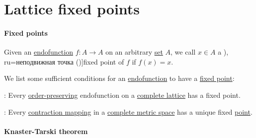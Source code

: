 \section{Lattice fixed points}\label{sec:lattice_fixed_points}

\paragraph{Fixed points}

\begin{definition}\label{def:function_fixed_point}
  Given an \hyperref[def:function/endofunction]{endofunction} \( f: A \to A \) on an arbitrary \hyperref[def:set]{set} \( A \), we call \( x \in A \) a \term[bg=неподвижна точка (\cite[138]{Боянов2008ЧислениМетоди}), ru=неподвижная точка (\cite[\S 1.8.6]{Новиков2013ДискретнаяМатематика})]{fixed point} of \( f \) if \( f(x) = x \).
\end{definition}

\begin{theorem}\label{thm:fixed_point_existence}
  We list some sufficient conditions for an \hyperref[def:function/endofunction]{endofunction} to have a \hyperref[def:function_fixed_point]{fixed point}:
  \begin{thmenum}
     : Every \hyperref[def:order_function]{order-preserving} endofunction on a \hyperref[def:complete_lattice]{complete lattice} has a fixed point.

     : Every \hyperref[def:lipschitz_continuity/contraction]{contraction mapping} in a \hyperref[def:complete_metric_space]{complete metric space} has a unique fixed \hyperref[def:function_fixed_point]{point}.
  \end{thmenum}
\end{theorem}

\paragraph{Knaster-Tarski theorem}

